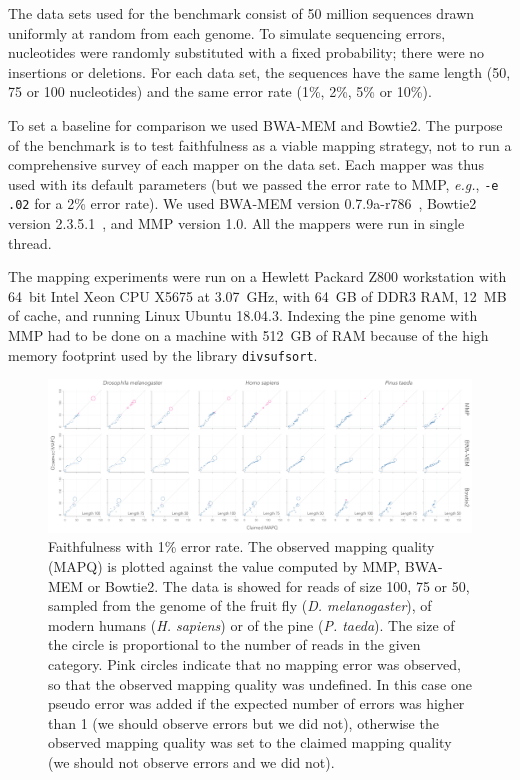 \documentclass[english]{article}
\begin{document}
The data sets used for the benchmark consist of 50 million sequences drawn
uniformly at random from each genome. To simulate sequencing errors,
nucleotides were randomly substituted with a fixed probability; there were
no insertions or deletions. For each data set, the sequences have the same
length (50, 75 or 100 nucleotides) and the same error rate (1\%, 2\%, 5\%
or 10\%).

To set a baseline for comparison we used BWA-MEM and Bowtie2. The purpose
of the benchmark is to test faithfulness as a viable mapping strategy, not
to run a comprehensive survey of each mapper on the data set. Each mapper
was thus used with its default parameters (but we passed the error rate to
MMP, \textit{e.g.}, \texttt{-e .02} for a 2\% error rate). We used BWA-MEM
version 0.7.9a-r786~\cite{li2013aligning}, Bowtie2 version
2.3.5.1~\cite{pmid22388286}, and MMP version 1.0. All the mappers were run
in single thread.

The mapping experiments were run on a Hewlett Packard Z800 workstation
with 64~bit Intel Xeon CPU X5675 at 3.07~GHz, with 64~GB of DDR3 RAM,
12~MB of cache, and running Linux Ubuntu 18.04.3. Indexing the pine genome
with MMP had to be done on a machine with 512~GB of RAM because of the
high memory footprint used by the library \texttt{divsufsort}.

\begin{figure}[h]
\begin{center}
\includegraphics[scale=.2]{fig_faith.pdf}
\end{center}
\caption{Faithfulness with 1\% error rate. The observed mapping quality
(MAPQ) is plotted against the value computed by MMP, BWA-MEM or Bowtie2.
The data is showed for reads of size 100, 75 or 50, sampled from the
genome of the fruit fly (\textit{D. melanogaster}), of modern humans
(\textit{H. sapiens}) or of the pine (\textit{P. taeda}). The size of the
circle is proportional to the number of reads in the given category. Pink
circles indicate that no mapping error was observed, so that the observed
mapping quality was undefined. In this case one pseudo error was added if
the expected number of errors was higher than 1 (we should observe errors
but we did not), otherwise the observed mapping quality was set to the
claimed mapping quality (we should not observe errors and we did not).}
\label{fig_faith}
\end{figure}
\end{document}
